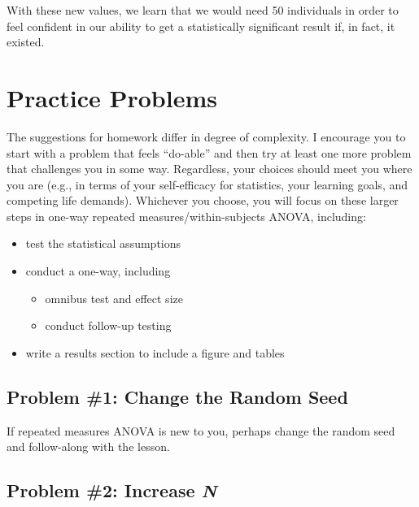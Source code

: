 \documentclass[
  11pt,
]{book}
\providecommand{\tightlist}{%
  \setlength{\itemsep}{0pt}\setlength{\parskip}{0pt}}
\begin{document}
With these new values, we learn that we would need 50 individuals in order to feel confident in our ability to get a statistically significant result if, in fact, it existed.

\hypertarget{practice-problems-7}{%
\section{Practice Problems}\label{practice-problems-7}}

The suggestions for homework differ in degree of complexity. I encourage you to start with a problem that feels ``do-able'' and then try at least one more problem that challenges you in some way. Regardless, your choices should meet you where you are (e.g., in terms of your self-efficacy for statistics, your learning goals, and competing life demands). Whichever you choose, you will focus on these larger steps in one-way repeated measures/within-subjects ANOVA, including:

\begin{itemize}
\tightlist
\item
  test the statistical assumptions
\item
  conduct a one-way, including

  \begin{itemize}
  \tightlist
  \item
    omnibus test and effect size
  \item
    conduct follow-up testing
  \end{itemize}
\item
  write a results section to include a figure and tables
\end{itemize}

\hypertarget{problem-1-change-the-random-seed-1}{%
\subsection{Problem \#1: Change the Random Seed}\label{problem-1-change-the-random-seed-1}}

If repeated measures ANOVA is new to you, perhaps change the random seed and follow-along with the lesson.

\hypertarget{problem-2-increase-n}{%
\subsection{\texorpdfstring{Problem \#2: Increase \emph{N}}{Problem \#2: Increase N}}\label{problem-2-increase-n}}
\end{document}
